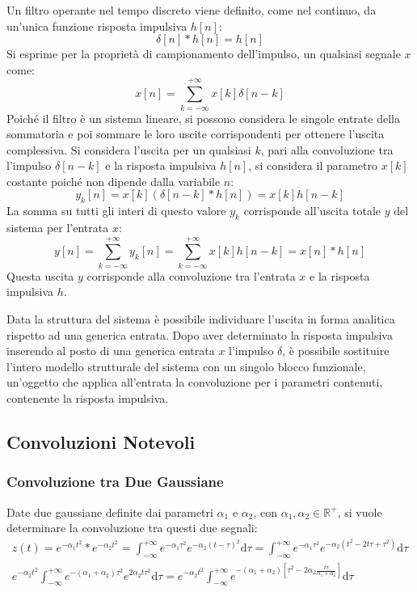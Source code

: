 \documentclass{article}
\newcommand{\df}{\mathrm{d}}
\numberwithin{equation}{subsection}
\begin{document}
Un filtro operante nel tempo discreto viene definito, come nel continuo, da un'unica funzione risposta impulsiva $h[n]$:
\begin{equation*}
    \delta[n]*h[n]=h[n]
\end{equation*}
Si esprime per la proprietà di campionamento dell'impulso, un qualsiasi segnale $x$ come:
\begin{equation*}
    x[n]=\displaystyle\sum_{k=-\infty}^{+\infty}x[k]\delta[n-k]
\end{equation*}
Poiché il filtro è un sistema lineare, si possono considera le singole entrate della sommatoria e poi sommare le loro uscite corrispondenti per ottenere l'uscita complessiva. 
Si considera l'uscita per un qualsiasi $k$, pari alla convoluzione tra l'impulso $\delta[n-k]$ e la risposta impulsiva $h[n]$, si considera il parametro $x[k]$ costante poiché 
non dipende dalla variabile $n$:
\begin{equation*}
    y_k[n]=x[k](\delta[n-k]*h[n])=x[k]h[n-k]
\end{equation*}
La somma su tutti gli interi di questo valore $y_k$ corrisponde all'uscita totale $y$ del sistema per l'entrata $x$:
\begin{equation*}
    y[n]=\displaystyle\sum_{k=-\infty}^{+\infty}y_k[n]=\sum_{k=-\infty}^{+\infty}x[k]h[n-k]=x[n]*h[n]
\end{equation*}
Questa uscita $y$ corrisponde alla convoluzione tra l'entrata $x$ e la risposta impulsiva $h$. 


Data la struttura del sistema è possibile individuare l'uscita in forma analitica rispetto ad una generica entrata. Dopo aver determinato la risposta impulsiva inserendo 
al posto di una generica entrata $x$ l'impulso $\delta$, è possibile sostituire l'intero modello strutturale del sistema con un singolo blocco funzionale, un'oggetto che 
applica all'entrata la convoluzione per i parametri contenuti, contenente la risposta impulsiva.  

\subsection{Convoluzioni Notevoli}

\subsubsection{Convoluzione tra Due Gaussiane}

Date due gaussiane definite dai parametri $\alpha_1$ e $\alpha_2$, con $\alpha_1,\alpha_2\in\mathbb{R}^+$, si vuole determinare la convoluzione tra questi due segnali:
\begin{gather*}
    z(t)=e^{-\alpha_1t^2}*e^{-\alpha_2t^2}=\displaystyle\int_{-\infty}^{+\infty}e^{-\alpha_1\tau^2}e^{-\alpha_2(t-\tau)^2}\df\tau=\int_{-\infty}^{+\infty}e^{-\alpha_1\tau^2}e^{-\alpha_2(t^2-2t\tau+\tau^2)}\df\tau\\
    \displaystyle e^{-\alpha_2 t^2}\int_{-\infty}^{+\infty}e^{-(\alpha_1+\alpha_2)\tau^2}e^{2\alpha_2t\tau^2}\df\tau=e^{-\alpha_2 t^2}\int_{-\infty}^{+\infty}e^{-(\alpha_1+\alpha_2)\left[\tau^2-2\alpha_2\frac{t\tau}{\alpha_1+\alpha_2}\right]}\df\tau
\end{gather*}
\end{document}
